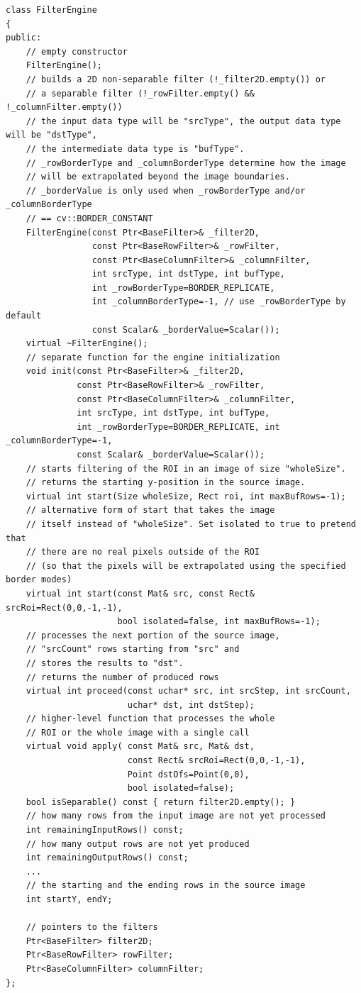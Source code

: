 \begin{lstlisting}
class FilterEngine
{
public:
    // empty constructor
    FilterEngine();
    // builds a 2D non-separable filter (!_filter2D.empty()) or
    // a separable filter (!_rowFilter.empty() && !_columnFilter.empty())
    // the input data type will be "srcType", the output data type will be "dstType",
    // the intermediate data type is "bufType".
    // _rowBorderType and _columnBorderType determine how the image
    // will be extrapolated beyond the image boundaries.
    // _borderValue is only used when _rowBorderType and/or _columnBorderType
    // == cv::BORDER_CONSTANT
    FilterEngine(const Ptr<BaseFilter>& _filter2D,
                 const Ptr<BaseRowFilter>& _rowFilter,
                 const Ptr<BaseColumnFilter>& _columnFilter,
                 int srcType, int dstType, int bufType,
                 int _rowBorderType=BORDER_REPLICATE,
                 int _columnBorderType=-1, // use _rowBorderType by default 
                 const Scalar& _borderValue=Scalar());
    virtual ~FilterEngine();
    // separate function for the engine initialization
    void init(const Ptr<BaseFilter>& _filter2D,
              const Ptr<BaseRowFilter>& _rowFilter,
              const Ptr<BaseColumnFilter>& _columnFilter,
              int srcType, int dstType, int bufType,
              int _rowBorderType=BORDER_REPLICATE, int _columnBorderType=-1,
              const Scalar& _borderValue=Scalar());
    // starts filtering of the ROI in an image of size "wholeSize".
    // returns the starting y-position in the source image.
    virtual int start(Size wholeSize, Rect roi, int maxBufRows=-1);
    // alternative form of start that takes the image
    // itself instead of "wholeSize". Set isolated to true to pretend that
    // there are no real pixels outside of the ROI
    // (so that the pixels will be extrapolated using the specified border modes)
    virtual int start(const Mat& src, const Rect& srcRoi=Rect(0,0,-1,-1),
                      bool isolated=false, int maxBufRows=-1);
    // processes the next portion of the source image,
    // "srcCount" rows starting from "src" and
    // stores the results to "dst".
    // returns the number of produced rows
    virtual int proceed(const uchar* src, int srcStep, int srcCount,
                        uchar* dst, int dstStep);
    // higher-level function that processes the whole
    // ROI or the whole image with a single call
    virtual void apply( const Mat& src, Mat& dst,
                        const Rect& srcRoi=Rect(0,0,-1,-1),
                        Point dstOfs=Point(0,0),
                        bool isolated=false);
    bool isSeparable() const { return filter2D.empty(); }
    // how many rows from the input image are not yet processed
    int remainingInputRows() const;
    // how many output rows are not yet produced
    int remainingOutputRows() const;
    ...
    // the starting and the ending rows in the source image
    int startY, endY;
    
    // pointers to the filters
    Ptr<BaseFilter> filter2D;
    Ptr<BaseRowFilter> rowFilter;
    Ptr<BaseColumnFilter> columnFilter;
};
\end{lstlisting}


